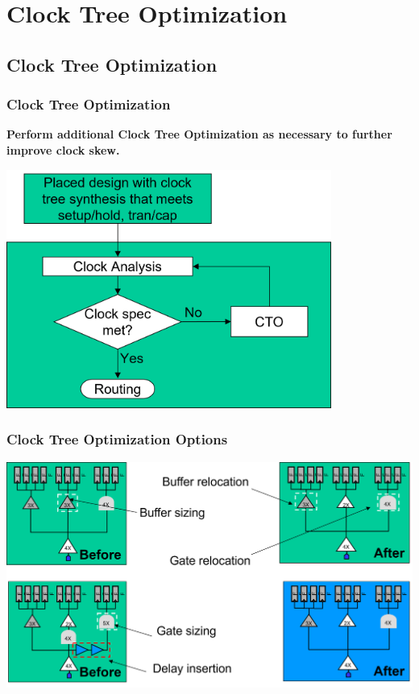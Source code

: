 \documentclass[compress]{beamer}
\begin{document}
\section[CTO]{Clock Tree Optimization}
\subsection[CTO]{Clock Tree Optimization }
\begin{frame}
	\frametitle{Clock Tree Optimization}
	\textbf{Perform additional Clock Tree Optimization as necessary to further improve clock skew.}
	\begin{center}
		\includegraphics[width=0.8\textwidth]{CTO}
	\end{center}
\end{frame}

\begin{frame}
	\frametitle{Clock Tree Optimization Options}
	\begin{center}
		\includegraphics[width=\textwidth]{CTO1}
	\end{center}
\end{frame}
\end{document}
